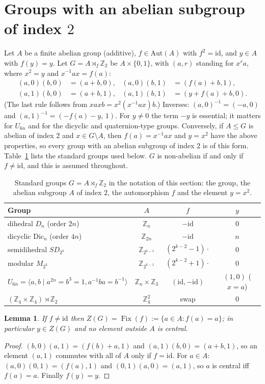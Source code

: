 \documentclass[preprint,11pt]{elsarticle}
\newtheorem{lemma}[theorem]{Lemma}
\theoremstyle{definition}
\theoremstyle{remark}
\DeclareMathOperator{\Fix}{Fix}
\newcommand{\Z}{\mathbb Z}
\begin{document}
\section{Groups with an abelian subgroup of index $2$}\label{sec:groups}

Let $A$ be a finite abelian group (additive), $f\in\mathrm{Aut}(A)$ with $f^2=\mathrm{id}$, and $y\in A$ with $f(y)=y$. Let $G=A\rtimes_f\Z_2$ be $A\times\{0,1\}$, with $(a,r)$ standing for $x^ra$, where $x^2=y$ and $x^{-1}ax=f(a)$:
\begin{align*}
(a,0)(b,0)&=(a+b,0), & (a,0)(b,1)&=(f(a)+b,1),\\
(a,1)(b,0)&=(a+b,1), & (a,1)(b,1)&=(y+f(a)+b,0).
\end{align*}
(The last rule follows from $xaxb=x^2(x^{-1}ax)b$.) Inverses: $(a,0)^{-1}=(-a,0)$ and $(a,1)^{-1}=(-f(a)-y,\,1)$. For $y\ne0$ the term $-y$ is essential; it matters for $U_{6n}$ and for the dicyclic and quaternion-type groups. Conversely, if $A\le G$ is abelian of index $2$ and $x\in G\setminus A$, then $f(a)=x^{-1}ax$ and $y=x^2$ have the above properties, so every group with an abelian subgroup of index $2$ is of this form. Table~\ref{tab:groups} lists the standard groups used below. $G$ is non-abelian if and only if $f\ne\mathrm{id}$, and this is assumed throughout.

\begin{table}[ht]
\centering
\small
\begin{tabular}{lccc}
Group & $A$ & $f$ & $y$\\\hline
dihedral $D_n$ (order $2n$) & $\Z_n$ & $-\mathrm{id}$ & $0$\\
dicyclic $\mathrm{Dic}_n$ (order $4n$) & $\Z_{2n}$ & $-\mathrm{id}$ & $n$\\
semidihedral $SD_{2^k}$ & $\Z_{2^{k-1}}$ & $(2^{k-2}-1)\cdot$ & $0$\\
modular $M_{2^k}$ & $\Z_{2^{k-1}}$ & $(2^{k-2}+1)\cdot$ & $0$\\
$U_{6n}=\langle a,b\mid a^{2n}=b^3=1,a^{-1}ba=b^{-1}\rangle$ & $\Z_n\times\Z_3$ & $(\mathrm{id},-\mathrm{id})$ & $(1,0)$ ($x=a$)\\
$(\Z_4\times\Z_4)\rtimes\Z_2$ & $\Z_4^2$ & swap & $0$
\end{tabular}
\caption{Standard groups $G=A\rtimes_f\Z_2$ in the notation of this section: the group, the abelian subgroup $A$ of index $2$, the automorphism $f$ and the element $y=x^2$.}\label{tab:groups}
\end{table}

\begin{lemma}\label{lem:center}
If $f\ne\mathrm{id}$ then $Z(G)=\Fix(f):=\{a\in A:f(a)=a\}$; in particular $y\in Z(G)$ and no element outside $A$ is central.
\end{lemma}
\begin{proof}
$(b,0)(a,1)=(f(b)+a,1)$ and $(a,1)(b,0)=(a+b,1)$, so an element $(a,1)$ commutes with all of $A$ only if $f=\mathrm{id}$. For $a\in A$: $(a,0)(0,1)=(f(a),1)$ and $(0,1)(a,0)=(a,1)$, so $a$ is central iff $f(a)=a$. Finally $f(y)=y$.
\end{proof}
\end{document}
